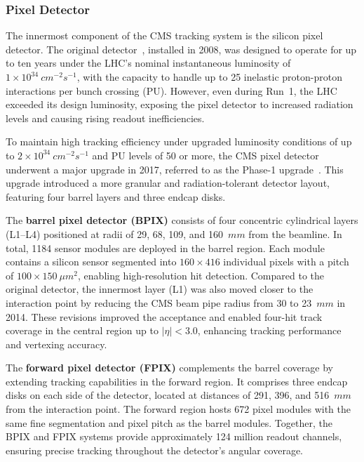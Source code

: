 \subsubsection{Pixel Detector}

The innermost component of the CMS tracking system is the silicon pixel detector. The original detector~\cite{LHC_CMS}, installed in 2008, was designed to operate for up to ten years under the LHC’s nominal instantaneous luminosity of $1 \times 10^{34}~\unit{cm}^{-2}\unit{s}^{-1}$, with the capacity to handle up to 25 inelastic proton-proton interactions per bunch crossing (PU). However, even during Run~1, the LHC exceeded its design luminosity, exposing the pixel detector to increased radiation levels and causing rising readout inefficiencies.

To maintain high tracking efficiency under upgraded luminosity conditions of up to $2 \times 10^{34}~\unit{cm}^{-2}\unit{s}^{-1}$ and PU levels of 50 or more, the CMS pixel detector underwent a major upgrade in 2017, referred to as the Phase-1 upgrade~\cite{CMS_Detector_Run3, CMS_Tracker_Phase1_Upgrade}. This upgrade introduced a more granular and radiation-tolerant detector layout, featuring four barrel layers and three endcap disks.

The \textbf{barrel pixel detector (BPIX)} consists of four concentric cylindrical layers (L1--L4) positioned at radii of 29, 68, 109, and 160~$\unit{mm}$ from the beamline. In total, 1184 sensor modules are deployed in the barrel region. Each module contains a silicon sensor segmented into $160 \times 416$ individual pixels with a pitch of $100 \times 150~\unit{\mu m}^2$, enabling high-resolution hit detection. Compared to the original detector, the innermost layer (L1) was also moved closer to the interaction point by reducing the CMS beam pipe radius from 30 to 23~$\unit{mm}$ in 2014. These revisions improved the acceptance and enabled four-hit track coverage in the central region up to $|\eta| < 3.0$, enhancing tracking performance and vertexing accuracy.

The \textbf{forward pixel detector (FPIX)} complements the barrel coverage by extending tracking capabilities in the forward region. It comprises three endcap disks on each side of the detector, located at distances of 291, 396, and 516~$\unit{mm}$ from the interaction point. The forward region hosts 672 pixel modules with the same fine segmentation and pixel pitch as the barrel modules. Together, the BPIX and FPIX systems provide approximately 124 million readout channels, ensuring precise tracking throughout the detector’s angular coverage.

